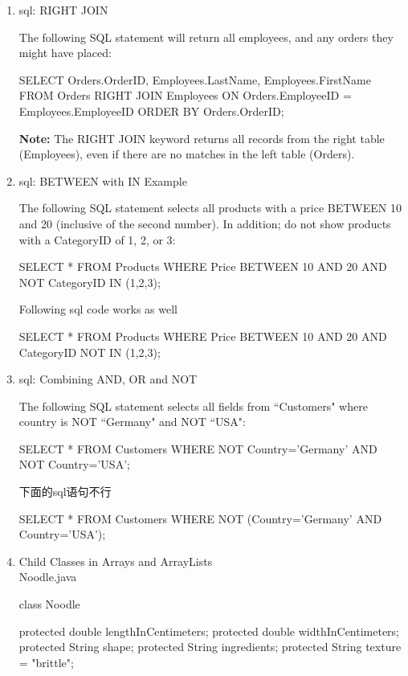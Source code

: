 \documentclass[a4paper,12pt]{article}
\begin{document}
\fontsize{14pt}{15.6pt}
\selectfont

\begin{enumerate}

\item sql: RIGHT JOIN

The following SQL statement will return all employees, and any orders they might have placed:
\begin{sqlcode}
SELECT Orders.OrderID, Employees.LastName, Employees.FirstName
FROM Orders
RIGHT JOIN Employees ON Orders.EmployeeID = Employees.EmployeeID
ORDER BY Orders.OrderID;
\end{sqlcode}
\textbf{Note:} The RIGHT JOIN keyword returns all records from the right table (Employees), even if there are no matches in the left table (Orders).

\item sql: BETWEEN with IN Example

The following SQL statement selects all products with a price BETWEEN 10 and 20 (inclusive of the second number). In addition; do not show products with a CategoryID of 1, 2, or 3:
\begin{sqlcode}
SELECT * FROM Products
WHERE Price BETWEEN 10 AND 20
AND NOT CategoryID IN (1,2,3);
\end{sqlcode}

Following sql code works as well
\begin{sqlcode}
SELECT * FROM Products
WHERE Price BETWEEN 10 AND 20
AND CategoryID NOT IN (1,2,3);
\end{sqlcode}

\item sql: Combining AND, OR and NOT

The following SQL statement selects all fields from ``Customers" where country is NOT ``Germany" and NOT ``USA":
\begin{sqlcode}
SELECT * FROM Customers
WHERE NOT Country='Germany' AND NOT Country='USA';
\end{sqlcode}

下面的sql语句不行
\begin{sqlcode}
SELECT * FROM Customers 
WHERE NOT (Country='Germany' AND Country='USA');
\end{sqlcode}

\item Child Classes in Arrays and ArrayLists\\
Noodle.java
\begin{javacode}
class Noodle {  
  protected double lengthInCentimeters;
  protected double widthInCentimeters;
  protected String shape;
  protected String ingredients;
  protected String texture = "brittle";
  
}
\end{javacode}
\end{enumerate}
\end{document}
